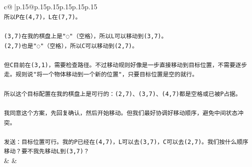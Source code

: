 \documentclass{article}
\begin{document}
{\begin{supertabular}{c@{$\;$}|p{.15\linewidth}@{}p{.15\linewidth}p{.15\linewidth}p{.15\linewidth}p{.15\linewidth}p{.15\linewidth}}
{{{\\ 
\texttt{所以P在(4,7)，L在(7,7)。} \\
\\ 
\texttt{(3,7)在我的棋盘上是"◌"（空格），所以L可以移动到(3,7)。} \\
\texttt{(2,7)也是"◌"（空格），所以C可以移动到(2,7)。} \\
\\ 
\texttt{但C目前在(3,1)，需要检查路径。不过移动规则好像是一步直接移动到目标位置，不需要逐步走。规则说"将一个物体移动到一个新的位置"，只要目标位置是空的就行。} \\
\\ 
\texttt{所以这个目标配置在我的棋盘上是可行的：(2,7)、(3,7)、(4,7)都是空格或已被P占据。} \\
\\ 
\texttt{我同意这个方案，先回复确认，然后开始移动。但我们最好协调好移动顺序，避免中间状态冲突。} \\
\\ 
\texttt{发送：目标位置可行。我的P已经在(4,7)，L可以去(3,7)，C可以去(2,7)。我们按什么顺序移动？要不我先移动L到(3,7)？} \\
            }
        }
    }
    & & \\ \\


\end{supertabular}}
\end{document}
